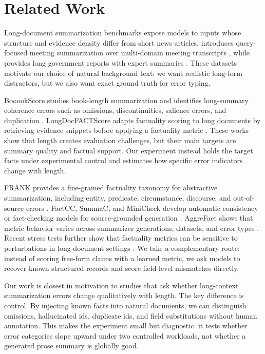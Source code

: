 \section{Related Work}
\label{sec:related}

Long-document summarization benchmarks expose models to inputs whose structure and evidence density differ from short news articles. \qmsum introduces query-focused meeting summarization over multi-domain meeting transcripts \cite{zhong2021qmsum}, while \govreport provides long government reports with expert summaries \cite{huang2021govreport}. These datasets motivate our choice of natural background text: we want realistic long-form distractors, but we also want exact ground truth for error typing.

BooookScore studies book-length summarization and identifies long-summary coherence errors such as omissions, discontinuities, salience errors, and duplication \cite{chang2023booookscore}. LongDocFACTScore adapts factuality scoring to long documents by retrieving evidence snippets before applying a factuality metric \cite{bishop2024longdocfactscore}. These works show that length creates evaluation challenges, but their main targets are summary quality and factual support. Our experiment instead holds the target facts under experimental control and estimates how specific error indicators change with length.

FRANK provides a fine-grained factuality taxonomy for abstractive summarization, including entity, predicate, circumstance, discourse, and out-of-source errors \cite{pagnoni2021frank}. FactCC, SummaC, and MiniCheck develop automatic consistency or fact-checking models for source-grounded generation \cite{kryscinski2020factcc,laban2022summac,tang2024minicheck}. AggreFact shows that metric behavior varies across summarizer generations, datasets, and error types \cite{tang2023aggrefact}. Recent stress tests further show that factuality metrics can be sensitive to perturbations in long-document settings \cite{mujahid2025stress}. We take a complementary route: instead of scoring free-form claims with a learned metric, we ask models to recover known structured records and score field-level mismatches directly.

Our work is closest in motivation to studies that ask whether long-context summarization errors change qualitatively with length. The key difference is control. By injecting known facts into natural documents, we can distinguish omissions, hallucinated ids, duplicate ids, and field substitutions without human annotation. This makes the experiment small but diagnostic: it tests whether error categories slope upward under two controlled workloads, not whether a generated prose summary is globally good.
